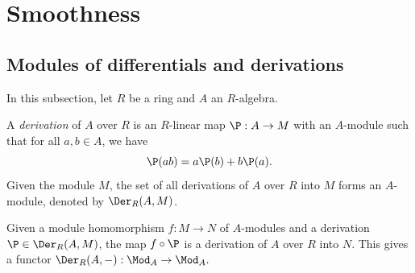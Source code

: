 \section{Smoothness}

\subsection{Modules of differentials and derivations}

    In this subsection, let $R$ be a ring and $A$ an $R$-algebra.

    \begin{definition}[Derivation]\label{def: derivation}
        A \emph{derivation} of $A$ over $R$ is an $R$-linear map $\P: A \to M$ with an $A$-module such that for all $a, b \in A$, we have
        \[
            \P(ab) = a\P(b) + b\P(a).
        \]
        Given the module $M$, the set of all derivations of $A$ over $R$ into $M$ forms an \(A\)-module, denoted by $\Der_R(A, M)$.
    \end{definition}

    Given a module homomorphism \(f: M \to N\) of \(A\)-modules and a derivation \(\P \in \Der_R(A, M)\), the map $f \circ \P$ is a derivation of \(A\) over \(R\) into \(N\).
    This gives a functor \(\Der_R(A, -): \Mod_A \to \Mod_A.\)

